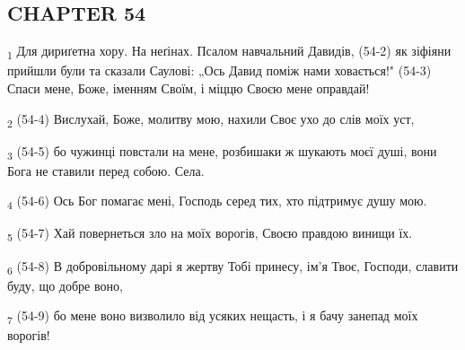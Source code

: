 \subsection{CHAPTER 54}
\begin{tcolorbox}
\textsubscript{1} Для дириґетна хору. На неґінах. Псалом навчальний Давидів, (54-2) як зіфіяни прийшли були та сказали Саулові: „Ось Давид поміж нами ховається!" (54-3) Спаси мене, Боже, іменням Своїм, і міццю Своєю мене оправдай!
\end{tcolorbox}
\begin{tcolorbox}
\textsubscript{2} (54-4) Вислухай, Боже, молитву мою, нахили Своє ухо до слів моїх уст,
\end{tcolorbox}
\begin{tcolorbox}
\textsubscript{3} (54-5) бо чужинці повстали на мене, розбишаки ж шукають моєї душі, вони Бога не ставили перед собою. Села.
\end{tcolorbox}
\begin{tcolorbox}
\textsubscript{4} (54-6) Ось Бог помагає мені, Господь серед тих, хто підтримує душу мою.
\end{tcolorbox}
\begin{tcolorbox}
\textsubscript{5} (54-7) Хай повернеться зло на моїх ворогів, Своєю правдою винищи їх.
\end{tcolorbox}
\begin{tcolorbox}
\textsubscript{6} (54-8) В добровільному дарі я жертву Тобі принесу, ім'я Твоє, Господи, славити буду, що добре воно,
\end{tcolorbox}
\begin{tcolorbox}
\textsubscript{7} (54-9) бо мене воно визволило від усяких нещасть, і я бачу занепад моїх ворогів!
\end{tcolorbox}
